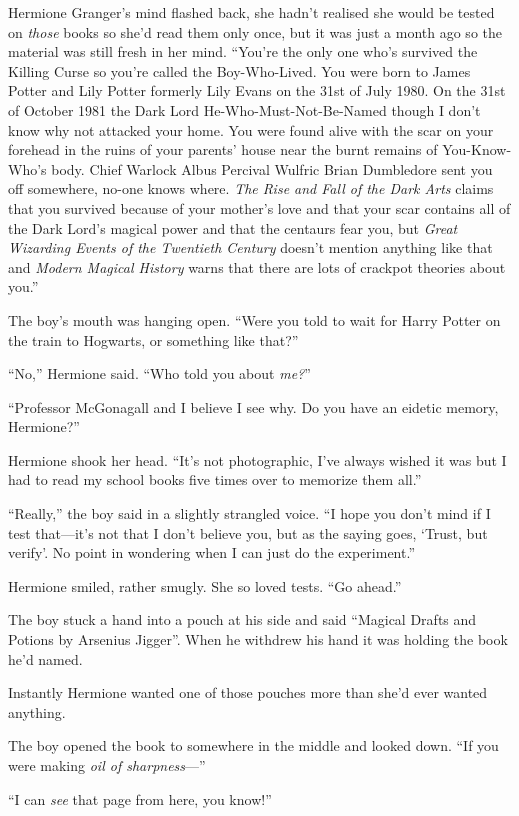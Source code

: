 Hermione Granger’s mind flashed back, she hadn’t realised she would be tested on \emph{those} books so she’d read them only once, but it was just a month ago so the material was still fresh in her mind. “You’re the only one who’s survived the Killing Curse so you’re called the Boy-Who-Lived. You were born to James Potter and Lily Potter formerly Lily Evans on the 31st of July 1980. On the 31st of October 1981 the Dark Lord He-Who-Must-Not-Be-Named though I don’t know why not attacked your home. You were found alive with the scar on your forehead in the ruins of your parents’ house near the burnt remains of You-Know-Who’s body. Chief Warlock Albus Percival Wulfric Brian Dumbledore sent you off somewhere, no-one knows where. \emph{The Rise and Fall of the Dark Arts} claims that you survived because of your mother’s love and that your scar contains all of the Dark Lord’s magical power and that the centaurs fear you, but \emph{Great Wizarding Events of the Twentieth Century} doesn’t mention anything like that and \emph{Modern Magical History} warns that there are lots of crackpot theories about you.”

The boy’s mouth was hanging open. “Were you told to wait for Harry Potter on the train to Hogwarts, or something like that?”

“No,” Hermione said. “Who told you about \emph{me?}”

“Professor McGonagall and I believe I see why. Do you have an eidetic memory, Hermione?”

Hermione shook her head. “It’s not photographic, I’ve always wished it was but I had to read my school books five times over to memorize them all.”

“Really,” the boy said in a slightly strangled voice. “I hope you don’t mind if I test that—it’s not that I don’t believe you, but as the saying goes, ‘Trust, but verify’. No point in wondering when I can just do the experiment.”

Hermione smiled, rather smugly. She so loved tests. “Go ahead.”

The boy stuck a hand into a pouch at his side and said “Magical Drafts and Potions by Arsenius Jigger”. When he withdrew his hand it was holding the book he’d named.

Instantly Hermione wanted one of those pouches more than she’d ever wanted anything.

The boy opened the book to somewhere in the middle and looked down. “If you were making \emph{oil of sharpness}—”

“I can \emph{see} that page from here, you know!”

